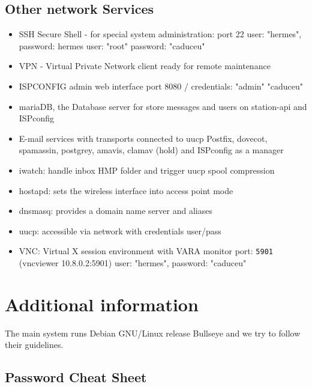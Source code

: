 \documentclass[11pt,a4paper]{article}
\begin{document}
\subsection{Other network Services }
\label{apx_other_net}


\begin{itemize}
    \item SSH Secure Shell - for special system administration: port 22\newline
        \hfill user: "hermes", password: hermes\newline
        \hfill user: "root" password: "caduceu"
    \item VPN -  Virtual Private Network client ready for remote maintenance 
    \item ISPCONFIG admin web interface\newline
        \hfill port 8080 / credentials: "admin" "caduceu"
    \item mariaDB, the Database server for store messages and users on station-api and ISPconfig
    \item E-mail  services with transports connected to uucp\newline
        \hfill Postfix, dovecot, spamassin, postgrey, amavis, clamav (hold) and ISPconfig as a manager 
    \item iwatch: handle inbox HMP folder and trigger uucp spool compression
    \item hostapd: sets the wireless interface into access point mode
    \item dnsmasq: provides a domain name server and aliases 
    \item uucp: accessible via network with credentials user/pass
    \item VNC: Virtual X session environment with VARA monitor
        \hfill port: \texttt{5901} (vncviewer 10.8.0.2:5901) 
        \hfill user: "hermes", password: "caduceu"
\end{itemize}

\section{Additional information}
\label{apx_adit_info}
    The main system runs Debian GNU/Linux release Bullseye and we try to follow their guidelines.

\subsection{Password Cheat Sheet}
\label{passwords}
\end{document}
